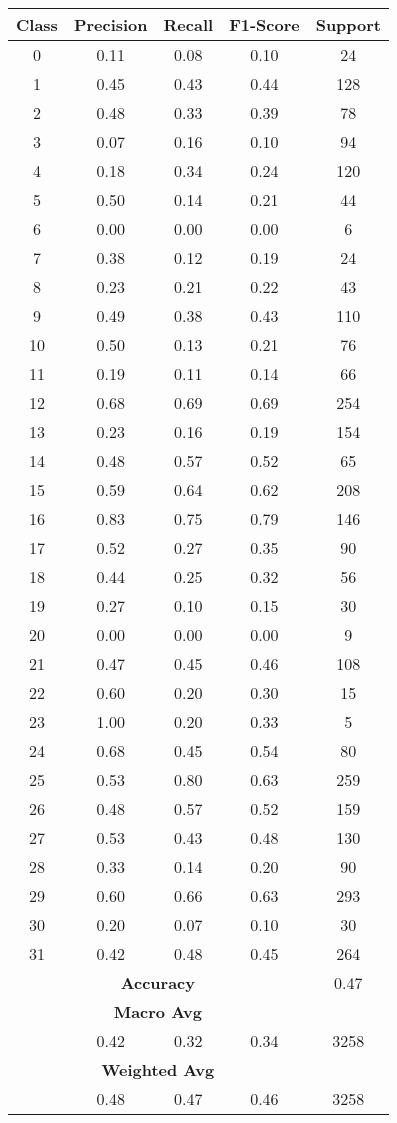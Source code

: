 \begin{tabular}{|c|c|c|c|c|}
\hline
\textbf{Class} & \textbf{Precision} & \textbf{Recall} & \textbf{F1-Score} & \textbf{Support} \\
\hline
0  & 0.11 & 0.08 & 0.10 & 24 \\
1  & 0.45 & 0.43 & 0.44 & 128 \\
2  & 0.48 & 0.33 & 0.39 & 78 \\
3  & 0.07 & 0.16 & 0.10 & 94 \\
4  & 0.18 & 0.34 & 0.24 & 120 \\
5  & 0.50 & 0.14 & 0.21 & 44 \\
6  & 0.00 & 0.00 & 0.00 & 6 \\
7  & 0.38 & 0.12 & 0.19 & 24 \\
8  & 0.23 & 0.21 & 0.22 & 43 \\
9  & 0.49 & 0.38 & 0.43 & 110 \\
10 & 0.50 & 0.13 & 0.21 & 76 \\
11 & 0.19 & 0.11 & 0.14 & 66 \\
12 & 0.68 & 0.69 & 0.69 & 254 \\
13 & 0.23 & 0.16 & 0.19 & 154 \\
14 & 0.48 & 0.57 & 0.52 & 65 \\
15 & 0.59 & 0.64 & 0.62 & 208 \\
16 & 0.83 & 0.75 & 0.79 & 146 \\
17 & 0.52 & 0.27 & 0.35 & 90 \\
18 & 0.44 & 0.25 & 0.32 & 56 \\
19 & 0.27 & 0.10 & 0.15 & 30 \\
20 & 0.00 & 0.00 & 0.00 & 9 \\
21 & 0.47 & 0.45 & 0.46 & 108 \\
22 & 0.60 & 0.20 & 0.30 & 15 \\
23 & 1.00 & 0.20 & 0.33 & 5 \\
24 & 0.68 & 0.45 & 0.54 & 80 \\
25 & 0.53 & 0.80 & 0.63 & 259 \\
26 & 0.48 & 0.57 & 0.52 & 159 \\
27 & 0.53 & 0.43 & 0.48 & 130 \\
28 & 0.33 & 0.14 & 0.20 & 90 \\
29 & 0.60 & 0.66 & 0.63 & 293 \\
30 & 0.20 & 0.07 & 0.10 & 30 \\
31 & 0.42 & 0.48 & 0.45 & 264 \\
\hline
\multicolumn{4}{|c|}{\textbf{Accuracy}} & 0.47 \\
\hline
\multicolumn{4}{|c|}{\textbf{Macro Avg}} & \\
\hline
 & 0.42 & 0.32 & 0.34 & 3258 \\
\hline
\multicolumn{4}{|c|}{\textbf{Weighted Avg}} & \\
\hline
 & 0.48 & 0.47 & 0.46 & 3258 \\
\hline
\end{tabular}
